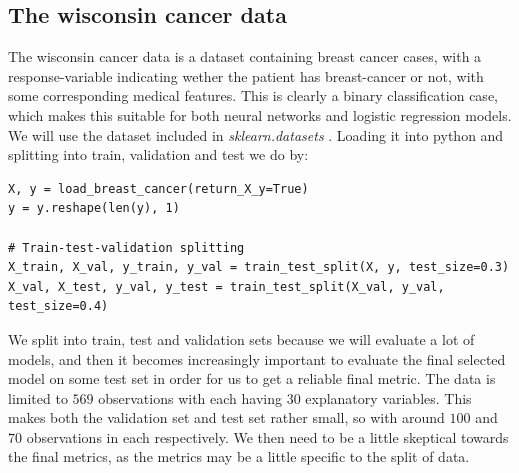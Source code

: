 \documentclass{article}
\begin{document}
\subsection{The wisconsin cancer data}
The wisconsin cancer data \cite{breastcancerwisconsin} is a dataset containing
breast cancer cases, with a response-variable indicating wether the patient has
breast-cancer or not, with some corresponding medical features. This is clearly
a binary classification case, which makes this suitable for both neural networks
and logistic regression models. We will use the dataset included in
\textit{sklearn.datasets} \cite{sklearncancerdata}. Loading it into python and
splitting into train, validation and test we do by:

\begin{lstlisting}
X, y = load_breast_cancer(return_X_y=True)
y = y.reshape(len(y), 1)

# Train-test-validation splitting
X_train, X_val, y_train, y_val = train_test_split(X, y, test_size=0.3)
X_val, X_test, y_val, y_test = train_test_split(X_val, y_val, test_size=0.4)
\end{lstlisting}

We split into train, test and validation sets because we will evaluate a lot of
models, and then it becomes increasingly important to evaluate the final
selected model on some test set in order for us to get a reliable final metric.
The data is limited to $569$ observations with each having $30$ explanatory
variables. This makes both the validation set and test set rather small, so with
around $100$ and $70$ observations in each respectively. We then need to be a
little skeptical towards the final metrics, as the metrics may be a little
specific to the split of data.
\end{document}
